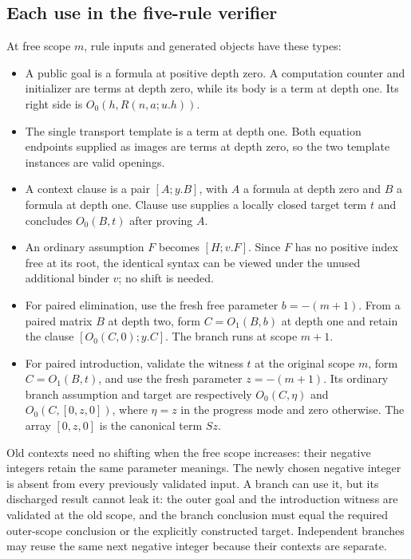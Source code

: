 \documentclass[11pt,letterpaper]{article}
\theoremstyle{definition}\newtheorem{definition}[theorem]{Definition}
\begin{document}
\subsection{Each use in the five-rule verifier}

At free scope $m$, rule inputs and generated objects have these types:
\begin{itemize}
\item A public goal is a formula at positive depth zero. A computation
counter and initializer are terms at depth zero, while its body is a
term at depth one. Its right side is $O_0(h,R(n,a;u.h))$.
\item The single transport template is a term at depth one. Both
equation endpoints supplied as images are terms at depth zero, so
the two template instances are valid openings.
\item A context clause is a pair $[A;y.B]$, with $A$ a formula at depth
zero and $B$ a formula at depth one. Clause use supplies a locally
closed target term $t$ and concludes $O_0(B,t)$ after proving $A$.
\item An ordinary assumption $F$ becomes $[H;v.F]$. Since $F$ has no
positive index free at its root, the identical syntax can be viewed
under the unused additional binder $v$; no shift is needed.
\item For paired elimination, use the fresh free parameter
$b=-(m+1)$. From a paired matrix $B$ at depth two, form
$C=O_1(B,b)$ at depth one and retain the clause $[O_0(C,0);y.C]$.
The branch runs at scope $m+1$.
\item For paired introduction, validate the witness $t$ at the original
scope $m$, form $C=O_1(B,t)$, and use the fresh parameter
$z=-(m+1)$. Its ordinary branch assumption and target are respectively
$O_0(C,\eta)$ and $O_0(C,[0,z,0])$, where $\eta=z$ in the progress
mode and zero otherwise. The array $[0,z,0]$ is the canonical term
$Sz$.
\end{itemize}

Old contexts need no shifting when the free scope increases: their
negative integers retain the same parameter meanings. The newly chosen
negative integer is absent from every previously validated input. A
branch can use it, but its discharged result cannot leak it: the outer
goal and the introduction witness are validated at the old scope, and
the branch conclusion must equal the required outer-scope conclusion
or the explicitly constructed target. Independent branches may reuse
the same next negative integer because their contexts are separate.
\end{document}
